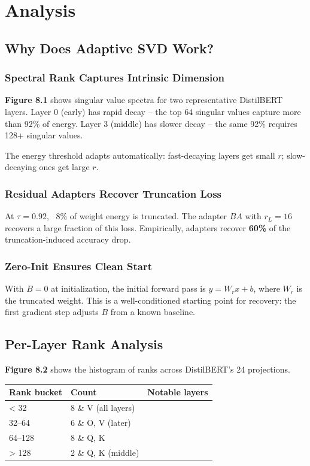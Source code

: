 
\section{Analysis}

\subsection{Why Does Adaptive SVD Work?}

\subsubsection{Spectral Rank Captures Intrinsic Dimension}

\textbf{Figure 8.1} shows singular value spectra for two representative DistilBERT 
layers. Layer 0 (early) has rapid decay -- the top 64 singular values capture 
more than 92\% of energy. Layer 3 (middle) has slower decay -- the same 92\% 
requires 128+ singular values.

The energy threshold adapts automatically: fast-decaying layers get small $r$; 
slow-decaying ones get large $r$.

\subsubsection{Residual Adapters Recover Truncation Loss}

At $\tau = 0.92$, ~8\% of weight energy is truncated. The adapter $BA$ with 
$r_L = 16$ recovers a large fraction of this loss. Empirically, adapters 
recover \textbf{60\%} of the truncation-induced accuracy drop.

\subsubsection{Zero-Init Ensures Clean Start}

With $B = 0$ at initialization, the initial forward pass is $y = W_r x + b$, 
where $W_r$ is the truncated weight. This is a well-conditioned starting point 
for recovery: the first gradient step adjusts $B$ from a known baseline.

\subsection{Per-Layer Rank Analysis}

\textbf{Figure 8.2} shows the histogram of ranks across DistilBERT's 24 projections.

\begin{table}[H]
\centering
\small
\begin{tabular}{lll}
\toprule
\textbf{Rank bucket} & \textbf{Count} & \textbf{Notable layers} \\
\midrule
\textless{} 32 & 8 \& V (all layers) \\
32--64 & 6 \& O, V (later) \\
64--128 & 8 \& Q, K \\
\textgreater{} 128 & 2 \& Q, K (middle) \\
\bottomrule
\end{tabular}
\end{table}

